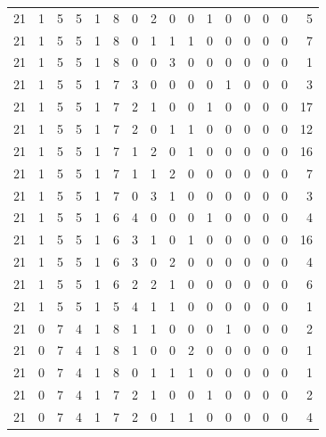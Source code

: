 \begin{appendix}
{\begin{longtable}{lrrrrrrrrrrrrrrr}
    21        & 1  & 5  & 5  & 1  & 8  & 0  & 2  & 0  & 0  & 1  & 0  & 0   & 0   & 0   & 5    \\
    21        & 1  & 5  & 5  & 1  & 8  & 0  & 1  & 1  & 1  & 0  & 0  & 0   & 0   & 0   & 7    \\
    21        & 1  & 5  & 5  & 1  & 8  & 0  & 0  & 3  & 0  & 0  & 0  & 0   & 0   & 0   & 1    \\
    21        & 1  & 5  & 5  & 1  & 7  & 3  & 0  & 0  & 0  & 0  & 1  & 0   & 0   & 0   & 3    \\
    21        & 1  & 5  & 5  & 1  & 7  & 2  & 1  & 0  & 0  & 1  & 0  & 0   & 0   & 0   & 17   \\
    21        & 1  & 5  & 5  & 1  & 7  & 2  & 0  & 1  & 1  & 0  & 0  & 0   & 0   & 0   & 12   \\
    21        & 1  & 5  & 5  & 1  & 7  & 1  & 2  & 0  & 1  & 0  & 0  & 0   & 0   & 0   & 16   \\
    21        & 1  & 5  & 5  & 1  & 7  & 1  & 1  & 2  & 0  & 0  & 0  & 0   & 0   & 0   & 7    \\
    21        & 1  & 5  & 5  & 1  & 7  & 0  & 3  & 1  & 0  & 0  & 0  & 0   & 0   & 0   & 3    \\
    21        & 1  & 5  & 5  & 1  & 6  & 4  & 0  & 0  & 0  & 1  & 0  & 0   & 0   & 0   & 4    \\
    21        & 1  & 5  & 5  & 1  & 6  & 3  & 1  & 0  & 1  & 0  & 0  & 0   & 0   & 0   & 16   \\
    21        & 1  & 5  & 5  & 1  & 6  & 3  & 0  & 2  & 0  & 0  & 0  & 0   & 0   & 0   & 4    \\
    21        & 1  & 5  & 5  & 1  & 6  & 2  & 2  & 1  & 0  & 0  & 0  & 0   & 0   & 0   & 6    \\
    21        & 1  & 5  & 5  & 1  & 5  & 4  & 1  & 1  & 0  & 0  & 0  & 0   & 0   & 0   & 1    \\
    21        & 0  & 7  & 4  & 1  & 8  & 1  & 1  & 0  & 0  & 0  & 1  & 0   & 0   & 0   & 2    \\
    21        & 0  & 7  & 4  & 1  & 8  & 1  & 0  & 0  & 2  & 0  & 0  & 0   & 0   & 0   & 1    \\
    21        & 0  & 7  & 4  & 1  & 8  & 0  & 1  & 1  & 1  & 0  & 0  & 0   & 0   & 0   & 1    \\
    21        & 0  & 7  & 4  & 1  & 7  & 2  & 1  & 0  & 0  & 1  & 0  & 0   & 0   & 0   & 2    \\
    21        & 0  & 7  & 4  & 1  & 7  & 2  & 0  & 1  & 1  & 0  & 0  & 0   & 0   & 0   & 4    \\

\end{longtable}}
\end{appendix}
